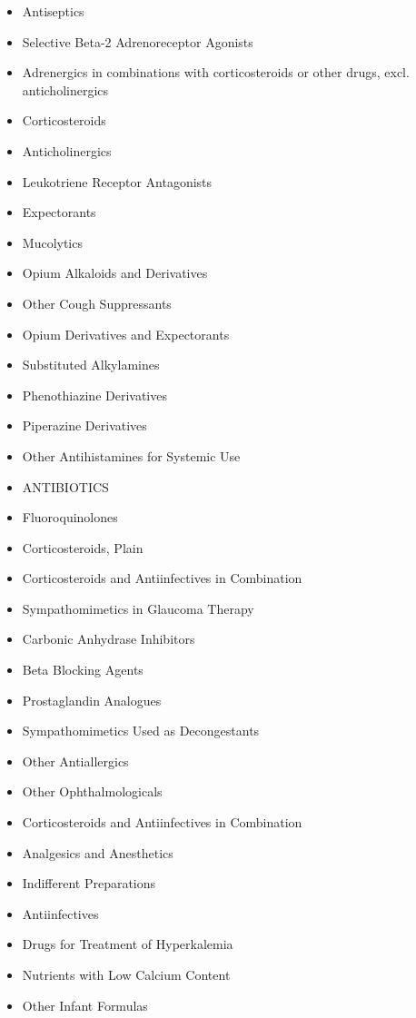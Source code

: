 \documentclass[a4paper,12pt]{article}
\begin{document}
\begin{appendices}
\begin{itemize}
   			\item Antiseptics
   			\item Selective Beta-2 Adrenoreceptor Agonists
   			\item Adrenergics in combinations with corticosteroids or other drugs, excl. anticholinergics
   			\item Corticosteroids
   			\item Anticholinergics
   			\item Leukotriene Receptor Antagonists
   			\item Expectorants
   			\item Mucolytics
   			\item Opium Alkaloids and Derivatives
   			\item Other Cough Suppressants
   			\item Opium Derivatives and Expectorants
   			\item Substituted Alkylamines
   			\item Phenothiazine Derivatives
   			\item Piperazine Derivatives
   			\item Other Antihistamines for Systemic Use
   			\item ANTIBIOTICS
   			\item Fluoroquinolones
   			\item Corticosteroids, Plain
   			\item Corticosteroids and Antiinfectives in Combination
   			\item Sympathomimetics in Glaucoma Therapy
   			\item Carbonic Anhydrase Inhibitors
   			\item Beta Blocking Agents
   			\item Prostaglandin Analogues
   			\item Sympathomimetics Used as Decongestants
   			\item Other Antiallergics
   			\item Other Ophthalmologicals
   			\item Corticosteroids and Antiinfectives in Combination
   			\item Analgesics and Anesthetics
   			\item Indifferent Preparations
   			\item Antiinfectives
   			\item Drugs for Treatment of Hyperkalemia
   			\item Nutrients with Low Calcium Content
   			\item Other Infant Formulas

\end{itemize}
\end{appendices}
\end{document}
